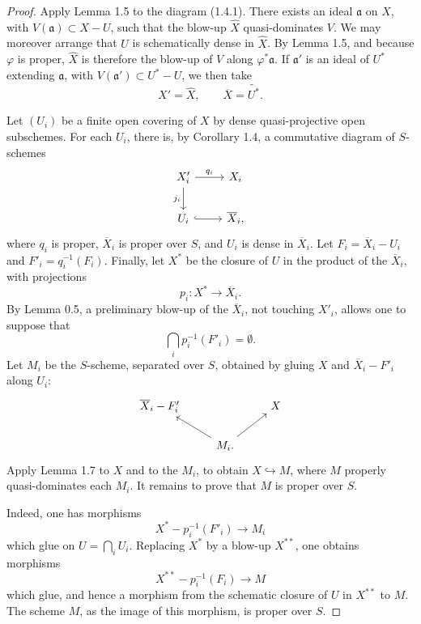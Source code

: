 \documentclass[11pt]{article}
\begin{document}
\begin{proof}
Apply Lemma 1.5 to the diagram (1.4.1). There exists an ideal \(\mathfrak a\) on \(X\), with \(V(\mathfrak a)\subset X-U\), such that the blow-up \(\widehat X\) quasi-dominates \(V\). We may moreover arrange that \(U\) is schematically dense in \(\widehat X\). By Lemma 1.5, and because \(\varphi\) is proper, \(\widehat X\) is therefore the blow-up of \(V\) along \(\varphi^*\mathfrak a\). If \(\mathfrak a'\) is an ideal of \(U^*\) extending \(\mathfrak a\), with \(V(\mathfrak a')\subset U^*-U\), we then take
\[
 X'=\widehat X,\qquad \overline X=\widetilde{U^*}.
\]

Let \((U_i)\) be a finite open covering of \(X\) by dense quasi-projective open subschemes. For each \(U_i\), there is, by Corollary 1.4, a commutative diagram of \(S\)-schemes
\[
\begin{tikzcd}
X'_i \ar[r,"q_i"] \ar[d,"j_i"'] & X_i \\
U_i \ar[r,hook] & \overline X_i,
\end{tikzcd}
\]
where \(q_i\) is proper, \(\overline X_i\) is proper over \(S\), and \(U_i\) is dense in \(\overline X_i\). Let \(F_i=\overline X_i-U_i\) and \(F'_i=q_i^{-1}(F_i)\). Finally, let \(X^*\) be the closure of \(U\) in the product of the \(\overline X_i\), with projections
\[
p_i:X^*\to \overline X_i.
\]
By Lemma 0.5, a preliminary blow-up of the \(\overline X_i\), not touching \(X'_i\), allows one to suppose that
\[
\bigcap_i p_i^{-1}(F'_i)=\emptyset.
\]
Let \(M_i\) be the \(S\)-scheme, separated over \(S\), obtained by gluing \(X\) and \(\overline X_i-F'_i\) along \(U_i\):
\[
\begin{tikzcd}
\overline X_i-F'_i && X \\
& M_i. \ar[ul] \ar[ur]
\end{tikzcd}
\]
Apply Lemma 1.7 to \(X\) and to the \(M_i\), to obtain \(X\hookrightarrow M\), where \(M\) properly quasi-dominates each \(M_i\). It remains to prove that \(M\) is proper over \(S\).

Indeed, one has morphisms
\[
X^*-p_i^{-1}(F'_i)\longrightarrow M_i
\]
which glue on \(U=\bigcap_i U_i\). Replacing \(X^*\) by a blow-up \(X^{**}\), one obtains morphisms
\[
X^{**}-p_i^{-1}(F_i)\longrightarrow M
\]
which glue, and hence a morphism from the schematic closure of \(U\) in \(X^{**}\) to \(M\). The scheme \(M\), as the image of this morphism, is proper over \(S\).
\end{proof}
\end{document}
